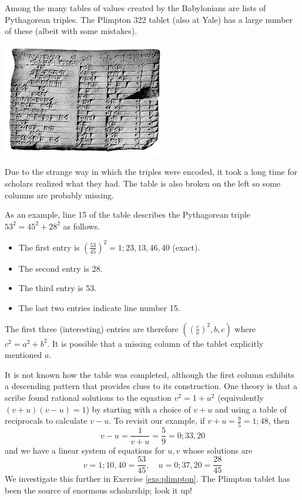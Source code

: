 \vfil\goodbreak




Among the many tables of values created by the Babylonians are lists of Pythagorean triples. The Plimpton 322 tablet (also at Yale) has a large number of these (albeit with some mistakes).
\begin{center}
	\includegraphics{plimpton322.jpg}
\end{center}
Due to the strange way in which the triples were encoded, it took a long time for scholars realized what they had. The table is also broken on the left so some columns are probably missing. %
\goodbreak

As an example, line 15 of the table describes the Pythagorean triple $53^2=45^2+28^2$ as follows.
\begin{itemize}
  \item The first entry is $(\frac{53}{45})^2=1;23,13,46,40$ (exact).
  \item The second entry is 28.
  \item The third entry is 53.
  \item The last two entries indicate line number 15.
\end{itemize}
The first three (interesting) entries are therefore $((\frac ca)^2,b,c)$ where $c^2=a^2+b^2$. It is possible that a missing column of the tablet explicitly mentioned $a$.
\smallbreak 

It is not known how the table was completed, although the first column exhibits a descending pattern that provides clues to its construction. One theory is that a scribe found rational solutions to the equation $v^2=1+u^2$ (equivalently $(v+u)(v-u)=1$) by starting with a choice of $v+u$ and using a table of reciprocals to calculate $v-u$.
\smallbreak
To revisit our example, if $v+u=\frac 95=1;48$, then
\[
	v-u=\frac 1{v+u}=\frac 59=0;33,20
\]
and we have a linear system of equations for $u,v$ whose solutions are
\[
	v=1;10,40=\frac{53}{45},\quad u=0;37,20=\frac{28}{45}
\]
We investigate this further in Exercise \ref{exs:plimpton}. The Plimpton tablet has been the source of enormous scholarship; look it up!


